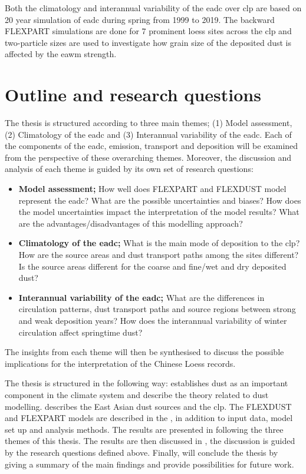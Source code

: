 Both the climatology and interannual variability of the \acrshort{eadc}  over \acrshort{clp} are based on 20 year simulation of \acrshort{eadc} during spring from 1999 to 2019.  
The backward FLEXPART simulations are done for 7 prominent loess sites across the \acrshort{clp} and two-particle sizes are used to investigate how grain size of the deposited dust is affected by the \acrshort{eawm} strength. 

\section{Outline and research questions}
The thesis is structured according to three main themes; (1) Model assessment, (2) Climatology of the \acrshort{eadc} and (3) Interannual variability of the \acrshort{eadc}. Each of the components of the \acrshort{eadc}, emission, transport and deposition will be examined from the perspective of these overarching themes. Moreover, the discussion and analysis of each theme is guided by its own set of research questions: 
\begin{itemize}
    \item \textbf{Model assessment;} How well does FLEXPART and FLEXDUST model represent the \acrshort{eadc}? What are the possible uncertainties and biases? How does the model uncertainties impact the interpretation of the model results? What are the advantages/disadvantages of this modelling approach?
    \item \textbf{Climatology of the \acrshort{eadc};} What is the main mode of deposition to the \acrshort{clp}? How are the source areas and dust transport paths among the sites different? Is the source areas different for the coarse and fine/wet and dry deposited dust? 
    \item \textbf{Interannual variability of the \acrshort{eadc};} What are the differences in circulation patterns, dust transport paths and source regions between strong and weak deposition years? How does the interannual variability of winter circulation affect springtime dust? 
\end{itemize}
The insights from each theme will then be synthesised to discuss the possible implications for the interpretation of the Chinese Loess records. 

The thesis is structured in the following way: 
 establishes dust as an important component in the climate system and describe the theory related to dust modelling. 
 describes the East Asian dust sources and the \acrshort{clp}. 
The FLEXDUST and FLEXPART models are described in the , in addition to input data, model set up and analysis methods. The results are presented in  following the three themes of this thesis. 
The results are then discussed in , the discussion is guided by the research questions defined above. Finally,  will conclude the thesis by giving a summary of the main findings and provide possibilities for future work. 
